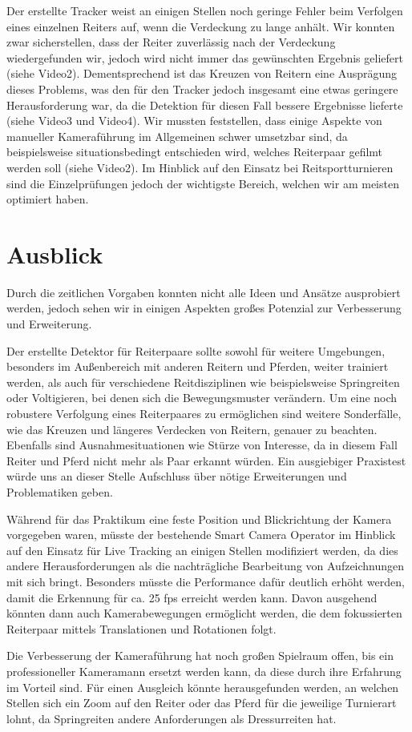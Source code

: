 Der erstellte Tracker weist an einigen Stellen noch geringe Fehler beim Verfolgen eines einzelnen Reiters auf, wenn die Verdeckung zu lange anhält. Wir konnten zwar sicherstellen, dass der Reiter zuverlässig nach der Verdeckung wiedergefunden wir, jedoch wird nicht immer das gewünschten Ergebnis geliefert (siehe Video2). Dementsprechend ist das Kreuzen von Reitern eine Ausprägung dieses Problems, was den für den Tracker jedoch insgesamt eine etwas geringere Herausforderung war, da die Detektion für diesen Fall bessere Ergebnisse lieferte (siehe Video3 und Video4).
Wir mussten feststellen, dass einige Aspekte von manueller Kameraführung im Allgemeinen schwer umsetzbar sind, da beispielsweise situationsbedingt entschieden wird, welches Reiterpaar gefilmt werden soll (siehe Video2). 
Im Hinblick auf den Einsatz bei Reitsportturnieren sind die Einzelprüfungen jedoch der wichtigste Bereich, welchen wir am meisten optimiert haben.


\section{Ausblick}
Durch die zeitlichen Vorgaben konnten nicht alle Ideen und Ansätze ausprobiert werden, jedoch sehen wir in einigen Aspekten großes Potenzial zur Verbesserung und Erweiterung.

Der erstellte Detektor für Reiterpaare sollte sowohl für weitere Umgebungen, besonders im Außenbereich mit anderen Reitern und Pferden, weiter trainiert werden, als auch für verschiedene Reitdisziplinen wie beispielsweise Springreiten oder Voltigieren, bei denen sich die Bewegungsmuster verändern. 
Um eine noch robustere Verfolgung eines Reiterpaares zu ermöglichen sind weitere Sonderfälle, wie das Kreuzen und längeres Verdecken von Reitern, genauer zu beachten. Ebenfalls sind Ausnahmesituationen wie Stürze von Interesse, da in diesem Fall Reiter und Pferd nicht mehr als Paar erkannt würden.
Ein ausgiebiger Praxistest würde uns an dieser Stelle Aufschluss über nötige Erweiterungen und Problematiken geben.

Während für das Praktikum eine feste Position und Blickrichtung der Kamera vorgegeben waren, müsste der bestehende Smart Camera Operator im Hinblick auf den Einsatz für Live Tracking an einigen Stellen modifiziert werden, da dies andere Herausforderungen als die nachträgliche Bearbeitung von Aufzeichnungen mit sich bringt. Besonders müsste die Performance dafür deutlich erhöht werden, damit die Erkennung für ca. 25 fps erreicht werden kann. Davon ausgehend könnten dann auch Kamerabewegungen ermöglicht werden, die dem fokussierten Reiterpaar mittels Translationen und Rotationen folgt.

Die Verbesserung der Kameraführung hat noch großen Spielraum offen, bis ein professioneller Kameramann ersetzt werden kann, da diese durch ihre Erfahrung im Vorteil sind. Für einen Ausgleich könnte herausgefunden werden, an welchen Stellen sich ein Zoom auf den Reiter oder das Pferd für die jeweilige Turnierart lohnt, da Springreiten andere Anforderungen als Dressurreiten hat.
